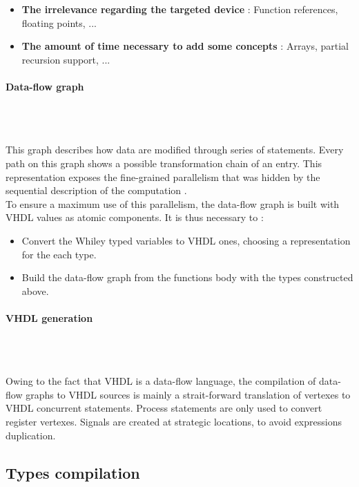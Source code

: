 \documentclass[10pt,a4paper]{article}
\renewcommand{\indent}{~\\\vspace{-.8cm}}
\newcommand{\pindent}{~\\\indent}
\begin{document}
\begin{itemize}
	\item \textbf{The irrelevance regarding the targeted device} : Function references, floating points, ...
	\item \textbf{The amount of time necessary to add some concepts} : Arrays, partial recursion support, ...
\end{itemize}

\paragraph{Data-flow graph}\pindent

This graph describes how data are modified through series of statements. Every path on this graph shows a possible transformation chain of an entry. This representation exposes the fine-grained parallelism that was hidden by the sequential description of the computation \cite{cardoso2003compilation, tripp2007trident, putnam2008chimps}. \\



To ensure a maximum use of this parallelism, the data-flow graph is built with VHDL values as atomic components. It is thus necessary to :

\begin{itemize}
	\item Convert the Whiley typed variables to VHDL ones, choosing a representation for the each type.
	\item Build the data-flow graph from the functions body with the types constructed above.
\end{itemize}

\paragraph{VHDL generation}\pindent

Owing to the fact that VHDL is a data-flow language, the compilation of data-flow graphs to VHDL sources is mainly a strait-forward translation of vertexes to VHDL concurrent statements. Process statements are only used to convert register vertexes. Signals are created at strategic locations, to avoid expressions duplication.



\subsection{Types compilation}\indent
\label{Types}
\end{document}

